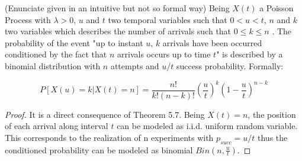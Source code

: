 \begin{theorem}
  (Enunciate given in an intuitive but not so formal way)
  \newline
  Being $X(t)$ a Poisson Process with $\lambda>0$, $u$ and $t$ two temporal variables such that $0<u<t$, $n$ and $k$ two variables which describes the number of arrivals such that $0\leq k\leq n$ . The probability of the event  "up to instant $u$, $k$ arrivals have been occurred conditioned by the fact that $n$ arrivals occurs up to time $t$" is described by a binomial distribution with $n$ attempts and $u/t$ success probability.
  Formally:

  \begin{equation}
  P[X(u)=k|X(t)=n]= \frac{n!}{k!(n-k)!}(\frac{u}{t})^k(1-\frac{u}{t})^{n-k}
  \end{equation}
  \begin{proof}
  	It is a direct consequence of Theorem 5.7.
  	Being $X(t)=n$, the position of each arrival along interval $t$ can be modeled as i.i.d. uniform random variable. This corresponds to the realization of n experiments with  $p_{succ}=u/t$  thus the conditioned probability can be modeled as binomial $Bin(n,\frac{u}{t})$.
  \end{proof}

\end{theorem}

